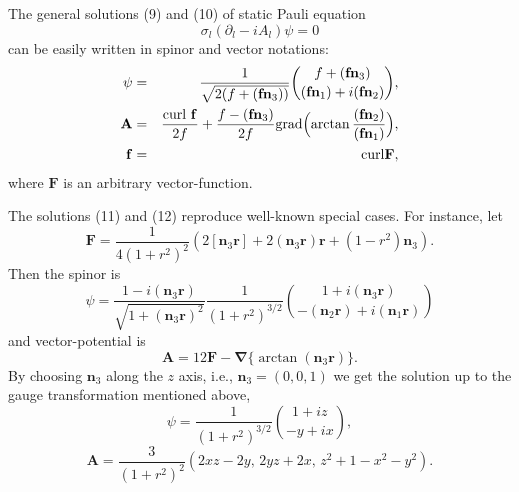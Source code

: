 \documentclass[12pt,a4paper]{article}
\begin{document}
The general solutions (9) and (10) of static Pauli equation
\begin{displaymath}
\sigma_l(\partial_l-iA_l)\psi=0
\end{displaymath}
can be easily written in spinor and vector notations:
\begin{eqnarray}
\psi & = & \frac{1}{\sqrt{2(f+(\mathbf{f}\mathbf{n}_3))}}{f+(\mathbf{f}\mathbf{n}_3)
\choose (\mathbf{f}\mathbf{n}_1)+i(\mathbf{f}\mathbf{n}_2)},  \\
\mathbf{A} & = & \frac{\mathrm{curl}\ \mathbf{f}}{2f}+\frac{f-(\mathbf{f}\mathbf{n}_3)}{2f}
\mathrm{grad}\Bigl(\arctan
\frac{(\mathbf{f}\mathbf{n}_2)}{(\mathbf{f}\mathbf{n}_1)}\Bigr), \\
\mathbf{f} & = & \mathrm{curl}\mathbf{F}, \nonumber
\end{eqnarray}
where $\mathbf{F}$ is an arbitrary vector-function.


The solutions  (11) and (12) reproduce well-known
special cases. For instance, let
\begin{displaymath}
\mathbf{F}=\frac{1}{4(1+r^2)^2}(2[\mathbf{n}_3\mathbf{r}]+
2(\mathbf{n}_3\mathbf{r})\mathbf{r}+(1-r^2)\mathbf{n}_3).
\end{displaymath}
Then the spinor is
\begin{displaymath}
\psi=\frac{1-i(\mathbf{n}_3\mathbf{r})}{\sqrt{1+(\mathbf{n}_3\mathbf{r})^2}}
\frac{1}{(1+r^2)^{3/2}}{1+i(\mathbf{n}_3\mathbf{r})
\choose -(\mathbf{n}_2\mathbf{r})+i(\mathbf{n}_1\mathbf{r})}
\end{displaymath}
and vector-potential is
\begin{displaymath}
\mathbf{A}=12\mathbf{F}-\mathbf{\nabla}\{\arctan(\mathbf{n}_3\mathbf{r})\}.
\end{displaymath}
By choosing $\mathbf{n}_3$ along the $z$ axis, i.e., $\mathbf{n}_3=(0,0,1)$ we get
the solution \cite{Nash} up to the gauge transformation mentioned above,
\begin{displaymath}
\psi=\frac{1}{(1+r^2)^{3/2}}{1+iz \choose -y+ix},
\end{displaymath}
\begin{displaymath}
\mathbf{A}=\frac{3}{(1+r^2)^2}(2xz-2y,\, 2yz+2x,\,
z^2+1-x^2-y^2).
\end{displaymath}
\end{document}
